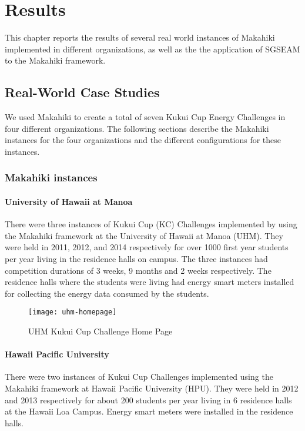 \chapter{Results}
\label{cha:results}

This chapter reports the results of several real world instances of Makahiki implemented in different organizations, as well as the the application of SGSEAM to the Makahiki framework.

\section{Real-World Case Studies}
\label{sec:realworld-result}

We used Makahiki to create a total of seven Kukui Cup Energy Challenges in four different organizations. The following sections describe the Makahiki instances for the four organizations and the different configurations for these instances.

\subsection{Makahiki instances}

\subsubsection{University of Hawaii at Manoa}

There were three instances of Kukui Cup (KC) Challenges implemented by using the Makahiki framework at the University of Hawaii at Manoa (UHM). They were held in 2011, 2012, and 2014 respectively for over 1000 first year students per year living in the residence halls on campus. The three instances had competition durations of 3 weeks, 9 months and 2 weeks respectively. The residence halls where the students were living had energy smart meters installed for collecting the energy data consumed by the students. 

\begin{figure}[ht!]
   \centering
   \texttt{[image: uhm-homepage]}
   \caption{UHM Kukui Cup Challenge Home Page}
   \label{fig:uhm-homepage}
\end{figure}

\subsubsection{Hawaii Pacific University}

There were two instances of Kukui Cup Challenges implemented using the Makahiki framework at Hawaii Pacific University (HPU). They were held in 2012 and 2013 respectively for about 200 students per year living in 6 residence halls at the Hawaii Loa Campus. Energy smart meters were installed in the residence halls.

